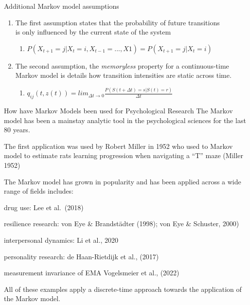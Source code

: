 \documentclass[
  ignorenonframetext,
]{beamer}
\providecommand{\tightlist}{%
  \setlength{\itemsep}{0pt}\setlength{\parskip}{0pt}}
\begin{document}
\begin{frame}{Additional Markov model assumptions}
\label{additional-markov-model-assumptions}
\begin{enumerate}
\tightlist
\item
  The first assumption states that the probability of future
  transitions\\
  is only influenced by the current state of the system

  \begin{enumerate}
  \tightlist
  \item
    \(P(X_{t+1}= j | X_{t} = i, X_{t-1} = ..., X1) = P(X_{t+1} = j | X_t = i)\)
  \end{enumerate}
\item
  The second assumption, the \emph{memoryless} property for a
  continuous-time Markov model is details how transition intensities are
  static across time.

  \begin{enumerate}
  \tightlist
  \item
    \(q_{ij}(t,z(t)) = lim_{\Delta t\rightarrow0} \frac{P(S(t+ \Delta t) = s|S(t) = r)}{\Delta t}\)
  \end{enumerate}
\end{enumerate}
\end{frame}

\begin{frame}{How have Markov Models been used for Psychological
Research}
\label{how-have-markov-models-been-used-for-psychological-research}
The Markov model has been a mainstay analytic tool in the psychological
sciences for the last 80 years.

The first application was used by Robert Miller in 1952 who used to
Markov model to estimate rats learning progression when navigating a
``T'' maze (Miller 1952)

The Markov model has grown in popularity and has been applied across a
wide range of fields includes:

drug use: Lee et al.~(2018)

resilience research: von Eye \& Brandstädter (1998); von Eye \&
Schuster, 2000)

interpersonal dynamics: Li et al., 2020

personality research: de Haan-Rietdijk et al., (2017)

measurement invariance of EMA Vogelsmeier et al., (2022)

All of these examples apply a discrete-time approach towards the
application of the Markov model.
\end{frame}
\end{document}
